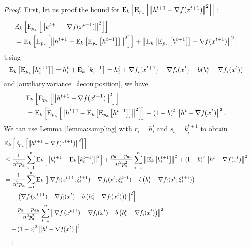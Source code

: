 \documentclass{article}
\newcommand*{\probavailable}{\ensuremath{p_{\textnormal{a}}}}
\newcommand*{\probpairaa}{\ensuremath{p_{\textnormal{aa}}}}
\begin{document}
\begin{proof}
  First, let us proof the bound for $\ExpSub{k}{\ExpSub{\probavailable}{\norm{h^{t+1} - \nabla f(x^{t+1})}^2}}$:
  \begin{align*}
      &\ExpSub{k}{\ExpSub{\probavailable}{\norm{h^{t+1} - \nabla f(x^{t+1})}^2}} \\
      &=\ExpSub{k}{\ExpSub{\probavailable}{\norm{h^{t+1} - \ExpSub{k}{\ExpSub{\probavailable}{h^{t+1}}}}^2}} + \norm{\ExpSub{k}{\ExpSub{\probavailable}{h^{t+1}}} - \nabla f(x^{t+1})}^2.
  \end{align*}
  Using
  \begin{align*}
      \ExpSub{k}{\ExpSub{\probavailable}{h^{t+1}_i}} = h^{t}_i + \ExpSub{k}{k^{t+1}_i} = h^{t}_i + \nabla f_i(x^{t+1}) - \nabla f_i(x^{t}) - b(h^t_i - \nabla f_i(x^{t}))
  \end{align*}
  and \eqref{auxiliary:variance_decomposition}, we have
  \begin{align*}
    &\ExpSub{k}{\ExpSub{\probavailable}{\norm{h^{t+1} - \nabla f(x^{t+1})}^2}} \\
    &=\ExpSub{k}{\ExpSub{\probavailable}{\norm{h^{t+1} - \ExpSub{k}{\ExpSub{\probavailable}{h^{t+1}}}}^2}} + \left(1 - b\right)^2 \norm{h^{t} - \nabla f(x^{t})}^2.
  \end{align*}
  We can use Lemma~\ref{lemma:sampling} with $r_i = h^{t}_i$ and $s_i = k^{t+1}_i$ to obtain
  \begin{align*}
    &\ExpSub{k}{\ExpSub{\probavailable}{\norm{h^{t+1} - \nabla f(x^{t+1})}^2}} \\
    &\leq \frac{1}{n^2 \probavailable}\sum_{i=1}^n\ExpSub{k}{\norm{k^{t+1}_i - \ExpSub{k}{k^{t+1}_i}}^2} +\frac{\probavailable - \probpairaa}{n^2 \probavailable^2}\sum_{i=1}^n\norm{\ExpSub{k}{k^{t+1}_i}}^2 + \left(1 - b\right)^2 \norm{h^{t} - \nabla f(x^{t})}^2\\
    &= \frac{1}{n^2 \probavailable}\sum_{i=1}^n\ExpSub{k}{\norm{\nabla f_i(x^{t+1};\xi^{t+1}_i) - \nabla f_i(x^{t};\xi^{t+1}_i) - b \left(h^t_i - \nabla f_i(x^{t};\xi^{t+1}_i)\right) \right.\right.\\
    &\left.\left. \quad- \left(\nabla f_i(x^{t+1}) - \nabla f_i(x^{t}) - b \left(h^t_i - \nabla f_i(x^{t})\right)\right)}^2} \\
    &\quad +\frac{\probavailable - \probpairaa}{n^2 \probavailable^2}\sum_{i=1}^n\norm{\nabla f_i(x^{t+1}) - \nabla f_i(x^{t}) - b \left(h^t_i - \nabla f_i(x^{t})\right)}^2 \\
    &\quad + \left(1 - b\right)^2 \norm{h^{t} - \nabla f(x^{t})}^2 \\

\end{align*}
\end{proof}
\end{document}
